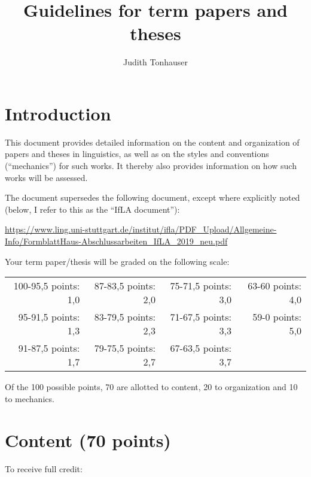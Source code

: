 \documentclass[11pt,fleqn,a4paper/thesis]{article}
\title{Guidelines for term papers and theses}
\author{Judith Tonhauser}
\affil{University of Stuttgart}
\newcommand{\6}{\mbox{$[\hspace*{-.6mm}[$}}
\newcommand{\9}{\mbox{$]\hspace*{-.6mm}]$}}
\begin{document}
\maketitle

\section{Introduction}

This document provides detailed information on the content and organization of papers and theses in linguistics, as well as on the styles and conventions (``mechanics'') for such works. It thereby also provides information on how such works will be assessed. 

The document supersedes the following document, except where explicitly noted (below, I refer to this as the ``IfLA document''):

\url{https://www.ling.uni-stuttgart.de/institut/ifla/PDF_Upload/Allgemeine-Info/FormblattHaus-Abschlussarbeiten_IfLA_2019_neu.pdf}

Your term paper/thesis will be graded on the following scale: 

\setlength{\tabcolsep}{20pt}
\begin{tabular}{rrrr}
100-95,5 points: 1,0 & 87-83,5 points: 2,0 & 75-71,5 points: 3,0 & 63-60 points: 4,0  \\ 
95-91,5 points: 1,3 & 83-79,5 points: 2,3  & 71-67,5 points: 3,3 & 59-0 points: 5,0 \\
91-87,5 points: 1,7 & 79-75,5 points: 2,7 & 67-63,5 points: 3,7 & \\
\end{tabular}

Of the 100 possible points, 70 are allotted to content, 20 to organization and 10 to mechanics.

\section{Content (70 points)}

To receive full credit:
\end{document}
